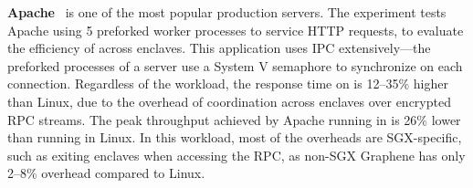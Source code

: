 


{\bf Apache}~\cite{apache} is one of the most popular production servers. The experiment tests Apache using 5 preforked worker processes to service HTTP requests,
to evaluate the efficiency of \graphenesgx{} across enclaves.
This application uses IPC extensively---the preforked processes of a server use a System V semaphore to synchronize on each connection.
Regardless of the workload, the response time on \graphenesgx{} is 12--35\% higher than Linux, due to the overhead of coordination across enclaves over encrypted RPC streams.
The peak throughput achieved by Apache running in \graphenesgx{} is 26\% lower than running in Linux.
In this workload, most of the overheads are SGX-specific, such as exiting enclaves when accessing the RPC, as non-SGX Graphene
has only 2--8\% overhead compared to Linux.



